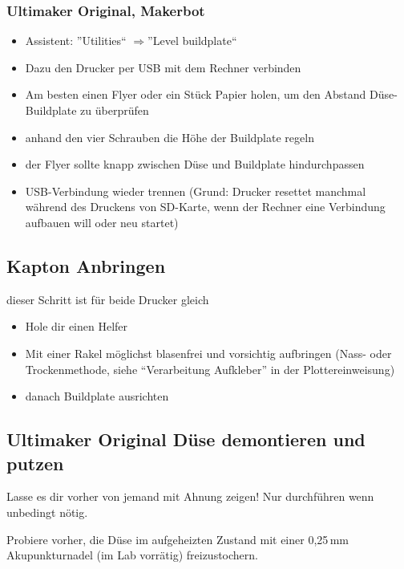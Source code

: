 \documentclass{\basedir/fablab-document}
\newcommand{\ra}{$\Rightarrow$}
\begin{document}
\subsubsection{Ultimaker Original, Makerbot}
\begin{itemize}
\item Assistent: ''Utilities`` \ra ''Level buildplate``
\item Dazu den Drucker per USB mit dem Rechner verbinden
\item Am besten einen Flyer oder ein Stück Papier holen, um den Abstand Düse-Buildplate zu überprüfen
\item anhand den vier Schrauben die Höhe der Buildplate regeln
\item der Flyer sollte knapp zwischen Düse und Buildplate hindurchpassen
\item USB-Verbindung wieder trennen (Grund: Drucker resettet manchmal während des Druckens von SD-Karte, wenn der Rechner eine Verbindung aufbauen will oder neu startet)
\end{itemize}

\subsection{Kapton Anbringen}

dieser Schritt ist für beide Drucker gleich
\begin{itemize}
\item Hole dir einen Helfer
\item Mit einer Rakel möglichst blasenfrei und vorsichtig aufbringen (Nass- oder Trockenmethode, siehe \enquote{Verarbeitung Aufkleber} in der Plottereinweisung)
\item danach Buildplate ausrichten
\end{itemize}

\subsection{Ultimaker Original Düse demontieren und putzen}
Lasse es dir vorher von jemand mit Ahnung zeigen! Nur durchführen wenn unbedingt nötig.

Probiere vorher, die Düse im aufgeheizten Zustand mit einer 0,25\,mm Akupunkturnadel (im Lab vorrätig) freizustochern.
\end{document}
